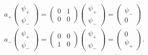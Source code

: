 \begin{equation}
\label{6} 
\begin{array}{c}
a_{+}\left( 
\begin{array}{c}
\psi _{+} \\ 
\psi _{-} 
\end{array}
\right) =\left( 
\begin{array}{cc}
0 & 1 \\ 
0 & 0 
\end{array}
\right) \left( 
\begin{array}{c}
\psi _{+} \\ 
\psi _{-} 
\end{array}
\right) =\left( 
\begin{array}{c}
\psi _{-} \\ 
0 
\end{array}
\right) \\ 
a_{-}\left( 
\begin{array}{c}
\psi _{+} \\ 
\psi _{-} 
\end{array}
\right) =\left( 
\begin{array}{cc}
0 & 0 \\ 
1 & 0 
\end{array}
\right) \left( 
\begin{array}{c}
\psi _{+} \\ 
\psi _{-} 
\end{array}
\right) =\left( 
\begin{array}{c}
0 \\ 
\psi _{+} 
\end{array}
\right) . 
\end{array}
\end{equation}

